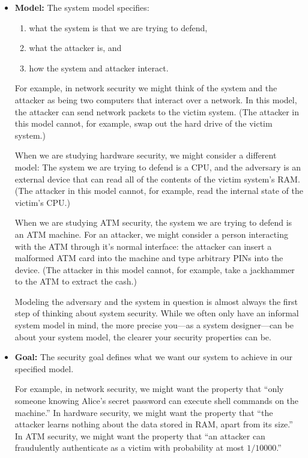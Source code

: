 \begin{itemize}
\item \textbf{Model:}
    The system model specifies:
    \begin{enumerate}
      \item what the system is that we are trying to defend, 
      \item what the attacker is, and
      \item how the system and attacker interact.
    \end{enumerate}
    For example, in network security we might think of the
    system and the attacker as being two computers that
    interact over a network. In this model, 
    the attacker can send network packets
    to the victim system. (The attacker in this model cannot,
    for example, swap out the hard drive of the victim system.)

    When we are studying hardware security, we might consider
    a different model: The system we are trying to defend is a CPU,
    and the adversary is an external device that can 
    read all of the contents of the victim system's RAM. (The
    attacker in this model cannot, for example, read the internal
    state of the victim's CPU.)

    When we are studying ATM security, the system
    we are trying to defend is an ATM machine. For
    an attacker, we might consider a person
    interacting with the ATM through it's normal
    interface: the 
    attacker can insert a malformed ATM card into the machine and type
    arbitrary PINs into the device. (The attacker in this model cannot,
    for example, take a jackhammer to the ATM to extract the cash.)

    Modeling the adversary and the system in question is almost
    always the first step of thinking about system security.
    While we often only have an informal system model in mind, the more
    precise you---as a system designer---can be about your system model,
    the clearer your security properties can be.

  \item \textbf{Goal:} 
    The security goal defines what we want our system to achieve in our specified model.

    For example, in network security, we might want the property that ``only someone
    knowing Alice's secret password can execute shell commands on the machine.''
    In hardware security, we might want the property that ``the attacker learns nothing
    about the data stored in RAM, apart from its size.''
    In ATM security, we might want the property that ``an attacker can fraudulently 
    authenticate as a victim with probability at most $1/10000$.''


\end{itemize}
